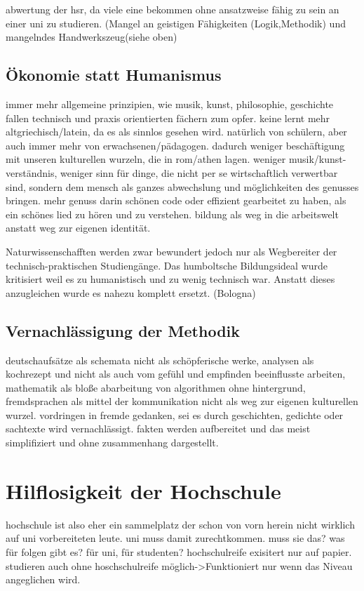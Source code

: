 \documentclass[a4paper,10pt,twoside,titlepage]{article}
\begin{document}
abwertung der hsr, da viele eine bekommen ohne ansatzweise fähig zu sein an einer uni zu studieren. (Mangel an geistigen Fähigkeiten (Logik,Methodik) und mangelndes Handwerkszeug(siehe oben)  

\subsection{Ökonomie statt Humanismus}
immer mehr allgemeine prinzipien, wie musik, kunst, philosophie, geschichte fallen technisch und praxis orientierten fächern zum opfer. keine lernt mehr altgriechisch/latein, da es als sinnlos gesehen wird. natürlich von schülern, aber auch immer mehr von erwachsenen/pädagogen. dadurch weniger beschäftigung mit unseren kulturellen wurzeln, die in rom/athen lagen. weniger musik/kunst-verständnis, weniger sinn für dinge, die nicht per se wirtschaftlich verwertbar sind, sondern dem mensch als ganzes abwechslung und möglichkeiten des genusses bringen. mehr genuss darin schönen code oder effizient gearbeitet zu haben, als ein schönes lied zu hören und zu verstehen. bildung als weg in die arbeitswelt anstatt weg zur eigenen identität.

Naturwissenschafften werden zwar bewundert jedoch nur als Wegbereiter der technisch-praktischen Studiengänge. Das humboltsche Bildungsideal wurde kritisiert weil es zu humanistisch und zu wenig technisch war. Anstatt dieses anzugleichen wurde es nahezu komplett ersetzt. (Bologna)


\subsection{Vernachlässigung der Methodik}
deutschaufsätze als schemata nicht als schöpferische werke, analysen als kochrezept und nicht als auch vom gefühl und empfinden beeinflusste arbeiten, mathematik als bloße abarbeitung von algorithmen ohne hintergrund, fremdsprachen als mittel der kommunikation nicht als weg zur eigenen kulturellen wurzel. vordringen in fremde gedanken, sei es durch geschichten, gedichte oder sachtexte wird vernachlässigt. fakten werden aufbereitet und das meist simplifiziert und ohne zusammenhang dargestellt. 

\section{Hilflosigkeit der Hochschule}
hochschule ist also eher ein sammelplatz der schon von vorn herein nicht wirklich auf uni vorbereiteten leute. uni muss damit zurechtkommen. muss sie das? was für folgen gibt es? für uni, für studenten? hochschulreife exisitert nur auf papier. studieren auch ohne hoschschulreife möglich->Funktioniert nur wenn das Niveau angeglichen wird. 
\end{document}
